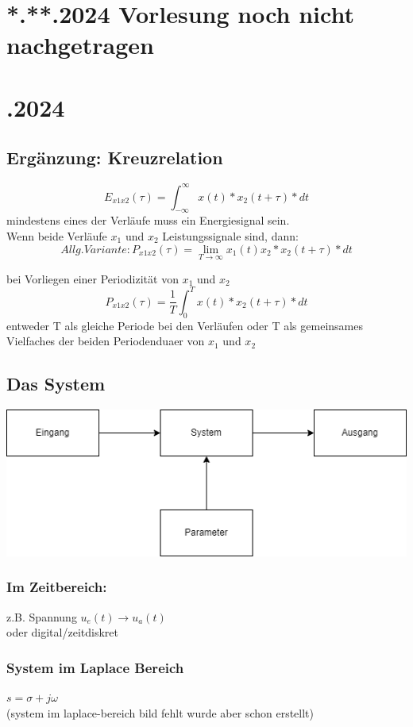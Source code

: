 \documentclass[a4paper]{article}
\begin{document}
\section*{\centering **.**.2024 Vorlesung noch nicht nachgetragen}

\newpage
\section*{.2024}
\subsection*{Ergänzung: Kreuzrelation}

\[
    E_{x1x2}(\tau)=\int_{-\infty}^{\infty}x(t)*x_2(t+\tau)*dt
\]
mindestens eines der Verläufe muss ein Energiesignal sein. \\
Wenn beide Verläufe $x_1$ und $x_2$ Leistungssignale sind, dann:
\[
    Allg. Variante: P_{x1x2}(\tau)=\lim_{T\to\infty}x_1(t)x_2*x_2(t+\tau)*dt
\]

    bei Vorliegen einer Periodizität von $x_1$ und $x_2$
\[
    P_{x1x2}(\tau)=\frac{1}{T}\int_{0}^{T}x(t)*x_2(t+\tau)*dt
\]
entweder T als gleiche Periode bei den Verläufen oder T als gemeinsames Vielfaches der beiden Periodenduaer von $x_1$ und $x_2$

\subsection*{\centering Das System}
\includegraphics[scale=0.8]{img/2024_11_11.png}

\subsubsection*{Im Zeitbereich:}
z.B. Spannung $u_e(t) \to u_a(t)$ \\
oder digital/zeitdiskret

\subsubsection*{System im Laplace Bereich}
$s=\sigma+j\omega$ \\
(system im laplace-bereich bild fehlt wurde aber schon erstellt)
\end{document}

